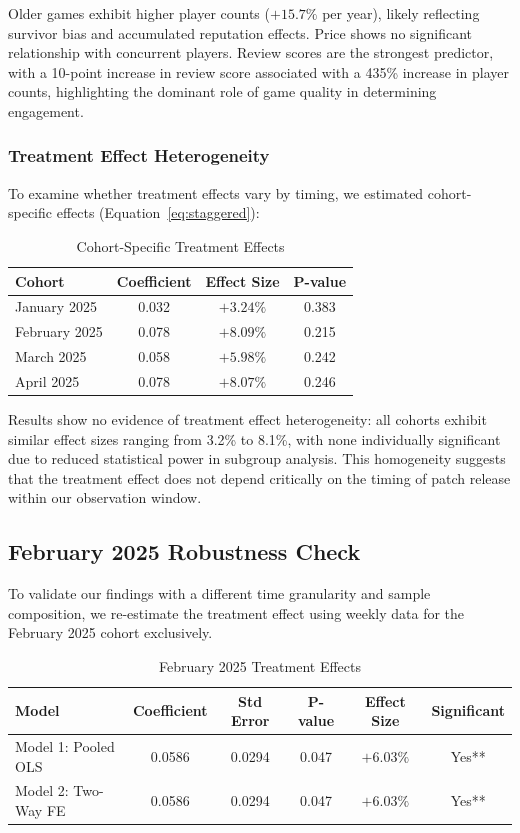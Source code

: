 \documentclass[12pt,a4paper]{article}
\begin{document}
Older games exhibit higher player counts ($+15.7\%$ per year), likely reflecting survivor bias and accumulated reputation effects. Price shows no significant relationship with concurrent players. Review scores are the strongest predictor, with a 10-point increase in review score associated with a 435\% increase in player counts, highlighting the dominant role of game quality in determining engagement.

\subsubsection{Treatment Effect Heterogeneity}

To examine whether treatment effects vary by timing, we estimated cohort-specific effects (Equation~\ref{eq:staggered}):

\begin{table}[H]
\centering
\caption{Cohort-Specific Treatment Effects}
\label{tab:cohorts}
\begin{tabular}{lccc}
\toprule
\textbf{Cohort} & \textbf{Coefficient} & \textbf{Effect Size} & \textbf{P-value} \\
\midrule
January 2025 & 0.032 & $+3.24\%$ & 0.383 \\
February 2025 & 0.078 & $+8.09\%$ & 0.215 \\
March 2025 & 0.058 & $+5.98\%$ & 0.242 \\
April 2025 & 0.078 & $+8.07\%$ & 0.246 \\
\bottomrule
\end{tabular}
\end{table}

Results show no evidence of treatment effect heterogeneity: all cohorts exhibit similar effect sizes ranging from 3.2\% to 8.1\%, with none individually significant due to reduced statistical power in subgroup analysis. This homogeneity suggests that the treatment effect does not depend critically on the timing of patch release within our observation window.

\subsection{February 2025 Robustness Check}

To validate our findings with a different time granularity and sample composition, we re-estimate the treatment effect using weekly data for the February 2025 cohort exclusively.

\begin{table}[H]
\centering
\caption{February 2025 Treatment Effects}
\label{tab:february}
\begin{tabular}{lccccc}
\toprule
\textbf{Model} & \textbf{Coefficient} & \textbf{Std Error} & \textbf{P-value} & \textbf{Effect Size} & \textbf{Significant} \\
\midrule
Model 1: Pooled OLS & 0.0586 & 0.0294 & 0.047 & $+6.03\%$ & Yes** \\
Model 2: Two-Way FE & 0.0586 & 0.0294 & 0.047 & $+6.03\%$ & Yes** \\
\bottomrule
\end{tabular}
\end{table}
\end{document}
